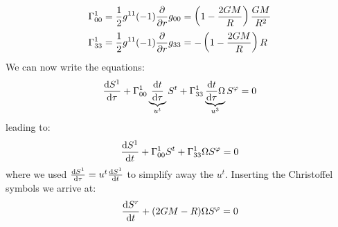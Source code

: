 \documentclass[../template.tex]{subfiles}
\begin{document}
\begin{example}
    \begin{align*}
        \Gamma_{00}^1 &= \frac{1}{2} g^{11} (-1)\pdv{r} g_{00} = \left(1- \frac{2GM}{R} \right)  \frac{GM}{R^2}    \\
        \Gamma^1_{33} &= \frac{1}{2} g^{11} (-1)\pdv{r} g_{33} = -\left(1-\frac{2GM}{R} \right) R
    \end{align*}
    We can now write the equations:
    \begin{align*}
        \dv{S^1}{\tau} + \Gamma^1_{00} \underbrace{\dv{t}{\tau}}_{u^t}  S^t + \Gamma^1_{33} \underbrace{\dv{t}{\tau} \Omega}_{u^3} S^\varphi = 0 
    \end{align*}
    leading to:
    \begin{align*}
        \dv{S^1}{t} + \Gamma_{00}^1 S^t + \Gamma^1_{33} \Omega S^\varphi = 0
    \end{align*}
    where we used $\dv{S^1}{\tau} = u^t \dv{S^1}{t}$ to simplify away the $u^t$. Inserting the Christoffel symbols we arrive at:
    \begin{align*}
        \dv{S^r}{t} + (2GM -R) \Omega S^\varphi = 0
    \end{align*}  

\end{example}
\end{document}
